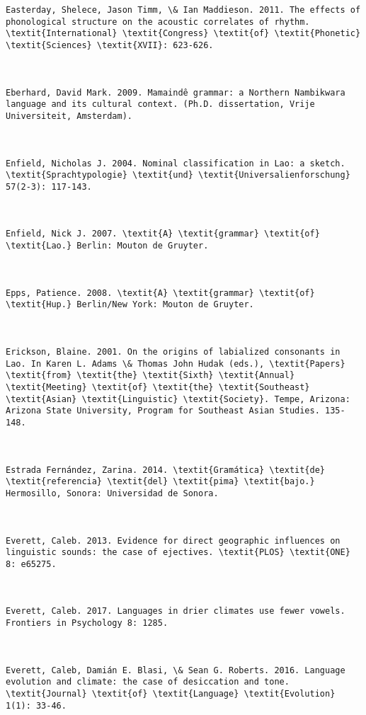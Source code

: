 \begin{verbatim}
Easterday, Shelece, Jason Timm, \& Ian Maddieson. 2011. The effects of phonological structure on the acoustic correlates of rhythm. \textit{International} \textit{Congress} \textit{of} \textit{Phonetic} \textit{Sciences} \textit{XVII}: 623-626.



Eberhard, David Mark. 2009. Mamaindê grammar: a Northern Nambikwara language and its cultural context. (Ph.D. dissertation, Vrije Universiteit, Amsterdam).



Enfield, Nicholas J. 2004. Nominal classification in Lao: a sketch. \textit{Sprachtypologie} \textit{und} \textit{Universalienforschung} 57(2-3): 117-143.



Enfield, Nick J. 2007. \textit{A} \textit{grammar} \textit{of} \textit{Lao.} Berlin: Mouton de Gruyter.



Epps, Patience. 2008. \textit{A} \textit{grammar} \textit{of} \textit{Hup.} Berlin/New York: Mouton de Gruyter.



Erickson, Blaine. 2001. On the origins of labialized consonants in Lao. In Karen L. Adams \& Thomas John Hudak (eds.), \textit{Papers} \textit{from} \textit{the} \textit{Sixth} \textit{Annual} \textit{Meeting} \textit{of} \textit{the} \textit{Southeast} \textit{Asian} \textit{Linguistic} \textit{Society}. Tempe, Arizona: Arizona State University, Program for Southeast Asian Studies. 135-148.



Estrada Fernández, Zarina. 2014. \textit{Gramática} \textit{de} \textit{referencia} \textit{del} \textit{pima} \textit{bajo.} Hermosillo, Sonora: Universidad de Sonora.



Everett, Caleb. 2013. Evidence for direct geographic influences on linguistic sounds: the case of ejectives. \textit{PLOS} \textit{ONE} 8: e65275.



Everett, Caleb. 2017. Languages in drier climates use fewer vowels. Frontiers in Psychology 8: 1285.



Everett, Caleb, Damián E. Blasi, \& Sean G. Roberts. 2016. Language evolution and climate: the case of desiccation and tone. \textit{Journal} \textit{of} \textit{Language} \textit{Evolution} 1(1): 33-46.




\end{verbatim}

